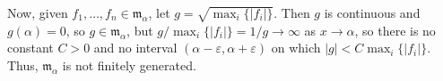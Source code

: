 \documentclass[12pt]{amsart}
\newcommand{\m}{\mathfrak{m}}
\newcommand{\p}{\mathfrak{p}}
\newcommand\itembi{\stepcounter{enumiii}\item[(\theenumiii)]}
\begin{document}
\begin{enumerate}
{\begin{enumerate}
Now, given $f_1,\dots,f_n\in \m_\alpha$, let $g=\sqrt{ \max_i\{ |f_i|\} }$. Then $g$ is continuous and $g(\alpha)=0$, so $g\in \m_\alpha$, but $g/  \max_i\{ |f_i|\} = 1 / g \to \infty$ as $x\to\alpha$, so there is no constant $C>0$ and no interval $(\alpha-\varepsilon,\alpha+\varepsilon)$ on which $|g| < C \max_i\{ |f_i|\}$. Thus, $\m_\alpha$ is not finitely generated.
\end{enumerate}}


\end{enumerate}
\end{document}
